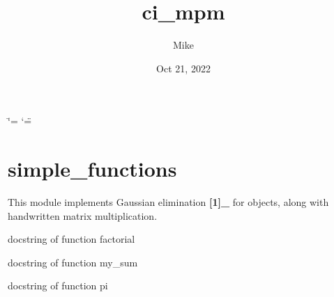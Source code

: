 \documentclass[letterpaper,10pt,english]{sphinxmanual}
\title{ci\_mpm}
\date{Oct 21, 2022}
\author{Mike}
\begin{document}
\ifdefined\shorthandoff
  \ifnum\catcode`\=\string=\active\shorthandoff{=}\fi
  \ifnum\catcode`\"=\active{}\fi
\fi

\pagestyle{empty}
\sphinxmaketitle
\pagestyle{plain}
\sphinxtableofcontents
\pagestyle{normal}
\label{\detokenize{index::doc}}



\chapter{simple\_functions}
\label{\detokenize{index:simple-functions}}
\sphinxAtStartPar
This module implements Gaussian elimination {\color{red}\bfseries{}{[}1{]}\_} for  objects, along with hand\sphinxhyphen{}written matrix multiplication.

\label{\detokenize{index:module-simple_functions}}

\begin{fulllineitems}
\label{\detokenize{index:simple_functions.factorial}}
\pysigstartsignatures
{}
\pysigstopsignatures
\sphinxAtStartPar
docstring of function factorial

\end{fulllineitems}


\begin{fulllineitems}
\label{\detokenize{index:simple_functions.my_sum}}
\pysigstartsignatures
{}
\pysigstopsignatures
\sphinxAtStartPar
docstring of function my\_sum

\end{fulllineitems}


\begin{fulllineitems}
\label{\detokenize{index:simple_functions.pi}}
\pysigstartsignatures
{}
\pysigstopsignatures
\sphinxAtStartPar
docstring of function pi

\end{fulllineitems}
\end{document}
